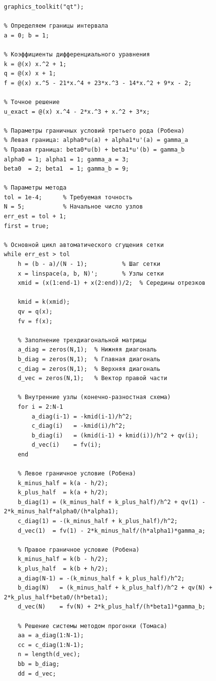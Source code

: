 \documentclass[14pt,a4paper]{extarticle}  %
\numberwithin{equation}{section}
\begin{document}
\begin{verbatim}
graphics_toolkit("qt");

% Определяем границы интервала
a = 0; b = 1;

% Коэффициенты дифференциального уравнения
k = @(x) x.^2 + 1;
q = @(x) x + 1;
f = @(x) x.^5 - 21*x.^4 + 23*x.^3 - 14*x.^2 + 9*x - 2;

% Точное решение
u_exact = @(x) x.^4 - 2*x.^3 + x.^2 + 3*x;

% Параметры граничных условий третьего рода (Робена)
% Левая граница: alpha0*u(a) + alpha1*u'(a) = gamma_a
% Правая граница: beta0*u(b) + beta1*u'(b) = gamma_b
alpha0 = 1; alpha1 = 1; gamma_a = 3;
beta0  = 2; beta1  = 1; gamma_b = 9;

% Параметры метода
tol = 1e-4;      % Требуемая точность
N = 5;           % Начальное число узлов
err_est = tol + 1;
first = true;

% Основной цикл автоматического сгущения сетки
while err_est > tol
    h = (b - a)/(N - 1);          % Шаг сетки
    x = linspace(a, b, N)';       % Узлы сетки
    xmid = (x(1:end-1) + x(2:end))/2;  % Середины отрезков

    kmid = k(xmid);
    qv = q(x);
    fv = f(x);

    % Заполнение трехдиагональной матрицы
    a_diag = zeros(N,1);  % Нижняя диагональ
    b_diag = zeros(N,1);  % Главная диагональ
    c_diag = zeros(N,1);  % Верхняя диагональ
    d_vec = zeros(N,1);   % Вектор правой части

    % Внутренние узлы (конечно-разностная схема)
    for i = 2:N-1
        a_diag(i-1) = -kmid(i-1)/h^2;
        c_diag(i)   = -kmid(i)/h^2;
        b_diag(i)   = (kmid(i-1) + kmid(i))/h^2 + qv(i);
        d_vec(i)    = fv(i);
    end

    % Левое граничное условие (Робена)
    k_minus_half = k(a - h/2);
    k_plus_half  = k(a + h/2);
    b_diag(1) = (k_minus_half + k_plus_half)/h^2 + qv(1) - 2*k_minus_half*alpha0/(h*alpha1);
    c_diag(1) = -(k_minus_half + k_plus_half)/h^2;
    d_vec(1)  = fv(1) - 2*k_minus_half/(h*alpha1)*gamma_a;

    % Правое граничное условие (Робена)
    k_minus_half = k(b - h/2);
    k_plus_half  = k(b + h/2);
    a_diag(N-1) = -(k_minus_half + k_plus_half)/h^2;
    b_diag(N)   = (k_minus_half + k_plus_half)/h^2 + qv(N) + 2*k_plus_half*beta0/(h*beta1);
    d_vec(N)    = fv(N) + 2*k_plus_half/(h*beta1)*gamma_b;

    % Решение системы методом прогонки (Томаса)
    aa = a_diag(1:N-1);
    cc = c_diag(1:N-1);
    n = length(d_vec);
    bb = b_diag;
    dd = d_vec;


\end{verbatim}
\end{document}
